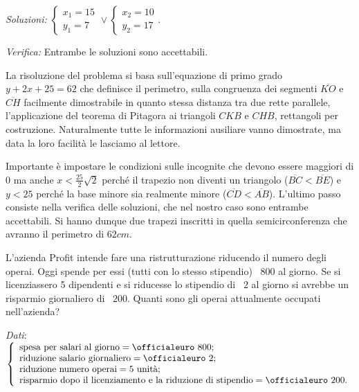 \emph{Soluzioni:} $\left\{\begin{array}{l}{x_1=15}\\{y_1=7}\end{array}\right.\vee \left\{\begin{array}{l}{x_2=10}\\{y_2=17}\end{array}\right.$.

\emph{Verifica:} Entrambe le soluzioni sono accettabili.

La risoluzione del problema si basa sull'equazione di primo grado $y+2x+25=62$ che definisce il perimetro, sulla congruenza dei segmenti $\overline{KO}$ e $\overline{CH}$ facilmente dimostrabile in quanto stessa distanza tra due rette parallele, l'applicazione del teorema di Pitagora ai triangoli $CKB$ e $CHB$, rettangoli per costruzione. Naturalmente tutte le informazioni ausiliare vanno dimostrate, ma data la loro facilità le lasciamo al lettore.

Importante è impostare le condizioni sulle incognite che devono essere maggiori di $0$ ma anche $x<\frac{25} 2\sqrt 2$ perché il trapezio non diventi un triangolo ($\overline{BC} < \overline{BE}$) e $y<25$ perché la base minore sia realmente minore ($\overline{CD} < \overline{AB}$). L'ultimo passo consiste nella verifica delle soluzioni, che nel nostro caso sono entrambe accettabili. Si hanno dunque due trapezi inscritti in quella semicirconferenza che avranno il perimetro di $62\unit{cm}$.

\begin{problema}
L'azienda Profit intende fare una ristrutturazione riducendo il numero degli operai. Oggi spende per essi (tutti con lo stesso stipendio) \officialeuro~$800$ al giorno. Se si licenziassero 5 dipendenti e si riducesse lo stipendio di \officialeuro~$2$ al giorno si avrebbe un risparmio giornaliero di \officialeuro~$200$. Quanti sono gli operai attualmente occupati nell'azienda?
\end{problema}

\emph{Dati}:$ \left\{\begin{array}{l}
\text{spesa per salari al giorno}=\text{\officialeuro~}800;\\
\text{riduzione salario giornaliero}=\text{\officialeuro~}2;\\
\text{riduzione numero operai}=5\text{ unità};\\
\text{risparmio dopo il licenziamento e la riduzione di stipendio}=\text{\officialeuro~}200.
\end{array}\right.$

